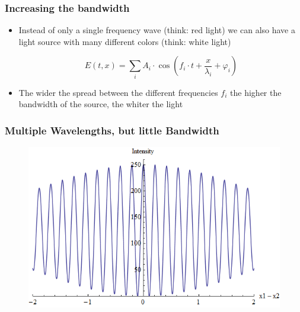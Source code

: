 \begin{frame}
    \frametitle{Increasing the bandwidth}
    \begin{itemize}
        \item Instead of only a single frequency wave (think: red light) we can also have a light source with many different colors (think: white light)

              \begin{equation}
                  E(t,x) = \sum_i{A_i \cdot \cos\left(f_i \cdot t + \frac{x}{\lambda_i} + \varphi_i\right)}
              \end{equation}
        \item The wider the spread between the different frequencies $f_i$ the higher the bandwidth of the source, the whiter the light
    \end{itemize}

\end{frame}


\begin{frame}
    \frametitle{Multiple Wavelengths, but little Bandwidth}

    \begin{figure}
        \includegraphics[height=0.65\textheight]{figures/Interference1.png}
    \end{figure}

\end{frame}


